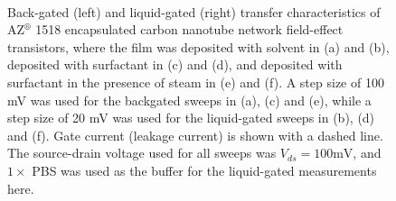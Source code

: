 \documentclass[
  a4paper,
]{scrbook}
\begin{document}
\begin{figure}
\begin{minipage}[t]{0.45\linewidth}
{{}

}

\end{minipage}%
%
\begin{minipage}[t]{0.01\linewidth}

{\centering 

~

}

\end{minipage}%

\caption[Back-gated and liquid-gated transfer characteristics of
encapsulated carbon nanotube network field-effect transistors with
thin-films deposited using various
methods.]{\label{fig-pristine-cnt-characteristics}Back-gated (left) and
liquid-gated (right) transfer characteristics of AZ\(^\circledR\) 1518
encapsulated carbon nanotube network field-effect transistors, where the
film was deposited with solvent in (a) and (b), deposited with
surfactant in (c) and (d), and deposited with surfactant in the presence
of steam in (e) and (f). A step size of 100 mV was used for the
backgated sweeps in (a), (c) and (e), while a step size of 20 mV was
used for the liquid-gated sweeps in (b), (d) and (f). Gate current
(leakage current) is shown with a dashed line. The source-drain voltage
used for all sweeps was \(V_{ds} = 100 \textrm{mV}\), and \(1 \times\)
PBS was used as the buffer for the liquid-gated measurements here.}

\end{figure}
\end{document}
